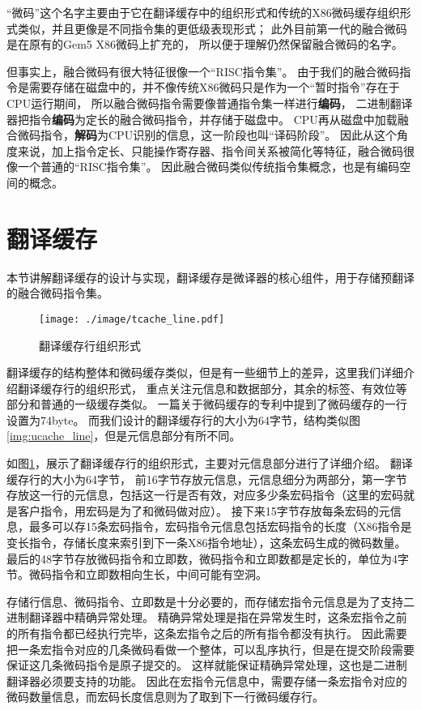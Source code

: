 “微码”这个名字主要由于它在翻译缓存中的组织形式和传统的X86微码缓存组织形式类似，并且更像是不同指令集的更低级表现形式；
此外目前第一代的融合微码是在原有的Gem5 X86微码上扩充的，
所以便于理解仍然保留融合微码的名字。

但事实上，融合微码有很大特征很像一个“RISC指令集”。
由于我们的融合微码指令是需要存储在磁盘中的，并不像传统X86微码只是作为一个“暂时指令”存在于CPU运行期间，
所以融合微码指令需要像普通指令集一样进行\textbf{编码}，
二进制翻译器把指令\textbf{编码}为定长的融合微码指令，并存储于磁盘中。
CPU再从磁盘中加载融合微码指令，\textbf{解码}为CPU识别的信息，这一阶段也叫“译码阶段”。
因此从这个角度来说，加上指令定长、只能操作寄存器、指令间关系被简化等特征，融合微码很像一个普通的“RISC指令集”。
因此融合微码类似传统指令集概念，也是有编码空间的概念。

\section{翻译缓存}

本节讲解翻译缓存的设计与实现，翻译缓存是微译器的核心组件，用于存储预翻译的融合微码指令集。

\begin{figure}[!htbp]
  \centering
  \texttt{[image: ./image/tcache\_line.pdf]}
  \caption{翻译缓存行组织形式}
  \label{img:tcache_line}
\end{figure}

翻译缓存的结构整体和微码缓存类似，但是有一些细节上的差异，这里我们详细介绍翻译缓存行的组织形式，
重点关注元信息和数据部分，其余的标签、有效位等部分和普通的一级缓存类似。
一篇关于微码缓存的专利\cite{uopPatent}中提到了微码缓存的一行设置为74byte。
而我们设计的翻译缓存行的大小为64字节，结构类似图\ref{img:ucache_line}，但是元信息部分有所不同。

如图\ref{img:tcache_line}，展示了翻译缓存行的组织形式，主要对元信息部分进行了详细介绍。
翻译缓存行的大小为64字节，
前16字节存放元信息，元信息细分为两部分，第一字节存放这一行的元信息，包括这一行是否有效，对应多少条宏码指令（这里的宏码就是客户指令，用宏码是为了和微码做对应）。
接下来15字节存放每条宏码的元信息，最多可以存15条宏码指令，宏码指令元信息包括宏码指令的长度（X86指令是变长指令，存储长度来索引到下一条X86指令地址），这条宏码生成的微码数量。
最后的48字节存放微码指令和立即数，微码指令和立即数都是定长的，单位为4字节。微码指令和立即数相向生长，中间可能有空洞。

存储行信息、微码指令、立即数是十分必要的，而存储宏指令元信息是为了支持二进制翻译器中精确异常处理。
精确异常处理是指在异常发生时，这条宏指令之前的所有指令都已经执行完毕，这条宏指令之后的所有指令都没有执行。
因此需要把一条宏指令对应的几条微码看做一个整体，可以乱序执行，但是在提交阶段需要保证这几条微码指令是原子提交的。
这样就能保证精确异常处理，这也是二进制翻译器必须要支持的功能。
因此在宏指令元信息中，需要存储一条宏指令对应的微码数量信息，而宏码长度信息则为了取到下一行微码缓存行。


